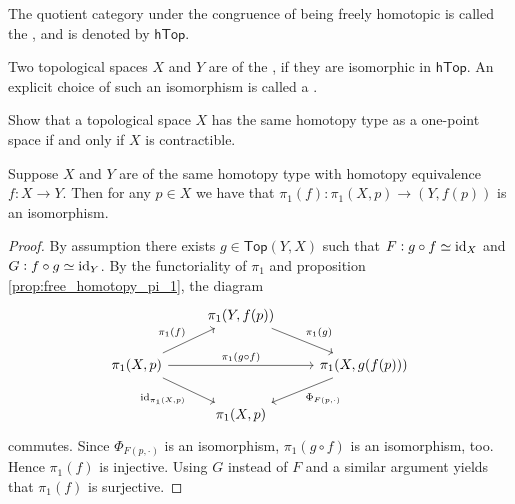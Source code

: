 \begin{definition}
	The quotient category under the congruence of being freely homotopic is called the , and is denoted by $\mathsf{hTop}$.
\end{definition}

\begin{definition}
	Two topological spaces $X$ and $Y$ are of the , if they are isomorphic in $\mathsf{hTop}$. An explicit choice of such an isomorphism is called a .
\end{definition}

\begin{exercise}
	Show that a topological space $X$ has the same homotopy type as a one-point space if and only if $X$ is contractible.
\end{exercise}

\begin{theorem}
	Suppose $X$ and $Y$ are of the same homotopy type with homotopy equivalence $f : X \to Y$. Then for any $p \in X$ we have that $\pi_1(f) : \pi_1(X,p) \to (Y,f(p))$ is an isomorphism.
	\label{thm:homotopy_invariance_pi_1}
\end{theorem}

\begin{proof}
	By assumption there exists $g \in \mathsf{Top}(Y,X)$ such that $F : g \circ f \simeq \operatorname{id}_X$ and $G : f \circ g \simeq \operatorname{id}_Y$. By the functoriality of $\pi_1$ and proposition \ref{prop:free_homotopy_pi_1}, the diagram
	\begin{equation*}
		\begin{tikzcd}
			& \pi_1(Y,f(p)) \arrow[dr,"\pi_1(g)"]\\
			\pi_1(X,p) \arrow[ur,"\pi_1(f)"]\arrow[dr,"\id_{\pi_1(X,p)}"']\arrow[rr,"\pi_1(g\circ f)"] & & \pi_1(X,g(f(p))) \arrow[dl,"\Phi_{F(p,\cdot)}"]\\
			& \pi_1(X,p)
		\end{tikzcd}
	\end{equation*}
	\noindent commutes. Since $\Phi_{F(p,\cdot)}$ is an isomorphism, $\pi_1(g \circ f)$ is an isomorphism, too. Hence $\pi_1(f)$ is injective. Using $G$ instead of $F$ and a similar argument yields that $\pi_1(f)$ is surjective.
\end{proof}

\begin{definition}
		
\end{definition}

